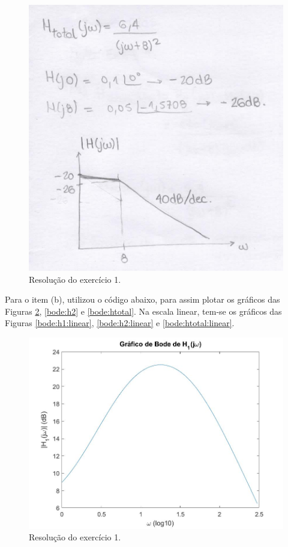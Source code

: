 \documentclass[a4paper,12pt,oneside,openany,table,xcdraw]{article}
\begin{document}
\begin{figure}[H]
\centering
\captionsetup{font=scriptsize}
\includegraphics[width=14.5cm]{scan3}
\caption{Resolução do exercício 1.}
\label{scan:1}
\end{figure}

\vspace{1cm}
Para o item (b), utilizou o código abaixo, para assim plotar os gráficos das Figuras \ref{bode:h1}, \ref{bode:h2} e \ref{bode:htotal}. Na escala linear, tem-se os gráficos das Figuras \ref{bode:h1:linear}, \ref{bode:h2:linear} e \ref{bode:htotal:linear}.

\vspace{1cm}

\begin{figure}[H]
\centering
\captionsetup{font=scriptsize}
\includegraphics[width=14.5cm]{Ex1_b1}
\caption{Resolução do exercício 1.}
\label{bode:h1}
\end{figure}
\end{document}
